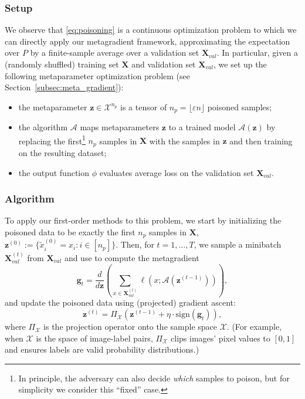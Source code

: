 \subsubsection{Setup}
We observe that \eqref{eq:poisoning} is a continuous optimization
problem to which we can directly apply our metagradient framework,
approximating the expectation over $P$ by a finite-sample average
over a validation set $\mathbf{X}_{val}$.
In particular, given a (randomly shuffled) training set $\mathbf{X}$
and validation set $\mathbf{X}_{val}$, we set up the
following metaparameter optimization problem (see
Section~\ref{subsec:meta_gradient}):
\begin{itemize}
  \item[(a)] the metaparameter $\mathbf{z} \in \mathcal{X}^{n_p}$ is
    a tensor of $n_p = \lfloor \varepsilon n \rfloor$
    poisoned samples;
  \item[(b)] the algorithm $\mathcal{A}$ maps metaparameters
    $\mathbf{z}$ to a trained model $\mathcal{A}(\mathbf{z})$ by
    replacing the first\footnote{In principle,
      the adversary can also decide {\em which} samples to poison, but
    for simplicity we consider this ``fixed'' case.} $n_p$ samples in
    $\mathbf{X}$ with the samples in $\mathbf{z}$
    and then training on the resulting dataset;
  \item[(c)] the output function $\phi$ evaluates average loss on the
    validation set $\mathbf{X}_{val}$.
\end{itemize}

\subsubsection{Algorithm}
To apply our first-order methods to this problem, we start by
initializing the poisoned data
to be exactly the first $n_p$ samples in $\mathbf{X}$,
\(
  \mathbf{z}^{(0)} := \{\widetilde{x}_i^{(0)} = x_i: i \in [n_p]\}.
\)
Then, for $t = 1, \ldots, T$, we sample a minibatch
$\mathbf{X}_{val}^{(t)}$ from $\mathbf{X}_{val}$
and use \replay{} to compute the metagradient
\[
  \mathbf{g}_t = \frac{d}{d\mathbf{z}} \left(
    \sum_{x \in \mathbf{X}_{val}^{(t)}} \ell(x; \mathcal{A}(\mathbf{z}^{(t-1)}))
  \right),
\]
and update the poisoned data using (projected) gradient ascent:
\[
  \mathbf{z}^{(t)} = \Pi_{\mathcal{X}}\left(
    \mathbf{z}^{(t-1)} + \eta\cdot \text{sign}(\mathbf{g}_t)
  \right),
\]
where $\Pi_{\mathcal{X}}$ is the projection operator onto the sample
space $\mathcal{X}$.
(For example, when $\mathcal{X}$ is the space of image-label pairs,
  $\Pi_{\mathcal{X}}$ clips images' pixel values to $[0, 1]$
and ensures labels are valid probability distributions.)

